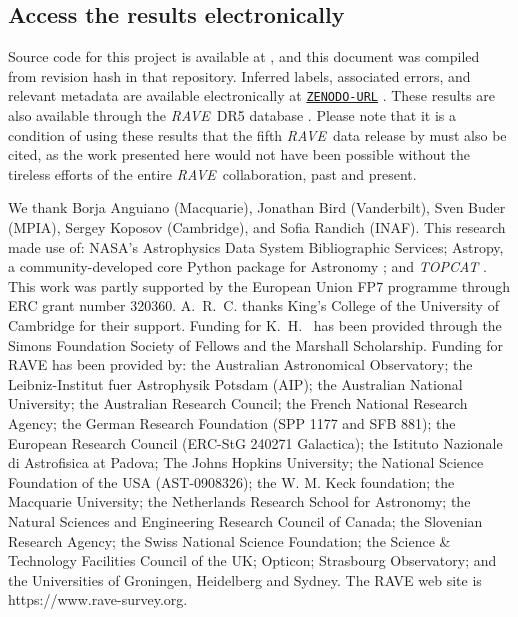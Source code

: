 \documentclass[preprint,trackchanges]{aastex}
\newcommand{\acronym}[1]{{\small{#1}}}
\newcommand{\project}[1]{\textsl{#1}}
\newcommand{\rave}{\project{\acronym{RAVE}}}
\begin{document}
\subsection*{Access the results electronically}

\noindent{}Source code for this project is available at \texttt{\giturl}\hspace{-0.5em},
and this document was compiled from revision hash \texttt{\githash} in that repository.
Inferred labels, associated errors, and relevant metadata are available electronically
at \texttt{\url{ZENODO-URL}} \citep{DATA_REPOSITORY}.  These results are also available
through the \rave\ DR5 database \citep{Kunder_2016}. Please note that it is a condition
of using these results that the fifth \rave\ data release by \citet{Kunder_2016} must 
also be cited, as the work presented here would not have been possible without the 
tireless efforts of the entire \rave\ collaboration, past and present.


\acknowledgements
We thank 
	Borja Anguiano (Macquarie),
	Jonathan Bird (Vanderbilt),
	Sven Buder (MPIA), 
	Sergey Koposov (Cambridge),
and 
	Sofia Randich (INAF).
This research made use of: 
  	NASA's Astrophysics Data System Bibliographic Services;
  	Astropy, a community-developed core Python package for Astronomy \citep{astropy};
and 
  	\project{TOPCAT} \citep{Taylor_2005}.
This work was partly supported by the European Union FP7 programme through ERC 
grant number 320360. A.~R.~C. thanks King's College of the University of Cambridge
for their support.  Funding for K.~H.~ has been provided through the Simons 
Foundation Society of Fellows and the Marshall Scholarship.
Funding for RAVE has been provided by: the Australian Astronomical Observatory; 
the Leibniz-Institut fuer Astrophysik Potsdam (AIP); the Australian National 
University; the Australian Research Council; the French National Research Agency;
the German Research Foundation (SPP 1177 and SFB 881); the European Research 
Council (ERC-StG 240271 Galactica); the Istituto Nazionale di Astrofisica at 
Padova; The Johns Hopkins University; the National Science Foundation of the USA
(AST-0908326); the W. M. Keck foundation; the Macquarie University; the 
Netherlands Research School for Astronomy; the Natural Sciences and Engineering 
Research Council of Canada; the Slovenian Research Agency; the Swiss National 
Science Foundation; the Science \& Technology Facilities Council of the UK; 
Opticon; Strasbourg Observatory; and the Universities of Groningen, Heidelberg 
and Sydney. The RAVE web site is https://www.rave-survey.org.  
\end{document}
